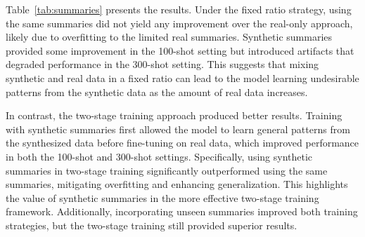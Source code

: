 Table~\ref{tab:summaries} presents the results. Under the fixed ratio strategy, using the same summaries did not yield any improvement over the real-only approach, likely due to overfitting to the limited real summaries. Synthetic summaries provided some improvement in the 100-shot setting but introduced artifacts that degraded performance in the 300-shot setting. This suggests that mixing synthetic and real data in a fixed ratio can lead to the model learning undesirable patterns from the synthetic data as the amount of real data increases.



In contrast, the two-stage training approach produced better results. Training with synthetic summaries first allowed the model to learn general patterns from the synthesized data before fine-tuning on real data, which improved performance in both the 100-shot and 300-shot settings. Specifically, using synthetic summaries in two-stage training significantly outperformed using the same summaries, mitigating overfitting and enhancing generalization. This highlights the value of synthetic summaries in the more effective two-stage training framework.
Additionally, incorporating unseen summaries improved both training strategies, but the two-stage training still provided superior results. 





